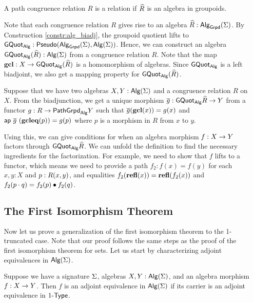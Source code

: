 \begin{definition}
A path congruence relation $R$ is a  relation if $\widehat{R}$ is an algebra in groupoids.
\end{definition}

Note that each congruence relation $R$ gives rise to an algebra $\widehat{R} : \mathsf{Alg}_{\mathsf{Grpd}}(\Sigma)$.
By Construction \ref{constr:alg_biadj}, the groupoid quotient lifts to $\mathsf{GQuot}_{\mathsf{Alg}} : \mathsf{Pseudo}(\mathsf{Alg}_{\mathsf{Grpd}}(\Sigma), \mathsf{Alg}(\Sigma))$.
Hence, we can construct an algebra $\mathsf{GQuot}_{\mathsf{Alg}}(\widehat{R}) : \mathsf{Alg}(\Sigma)$ from a congruence relation $R$.
Note that the map $\operatorname{\mathbf{gcl}} : X \rightarrow \mathsf{GQuot}_{\mathsf{Alg}}(\widehat{R})$ is a homomorphism of algebras.
Since $\mathsf{GQuot}_{\mathsf{Alg}}$ is a left biadjoint, we also get a mapping property for $\mathsf{GQuot}_{\mathsf{Alg}}(\widehat{R})$.

\begin{remark}
\label{remark:mapping_property_congruence}
Suppose that we have two algebras $X, Y : \mathsf{Alg}(\Sigma)$ and a congruence relation $R$ on $X$.
From the biadjunction, we get a unique morphism $\overline{g} : \mathsf{GQuot}_{\mathsf{Alg}}{\widehat{R}} \rightarrow Y$ from a functor $g : R \rightarrow \mathsf{PathGrpd}_{\mathsf{Alg}}{Y}$ such that $\overline{g}(\operatorname{\mathbf{gcl}}(x)) = g(x)$ and $\mathsf{ap} \ \overline{g} \ (\operatorname{\mathbf{gcleq}}(p)) = g(p)$ where $p$ is a morphism in $R$ from $x$ to $y$.

Using this, we can give conditions for when an algebra morphism $f : X \rightarrow Y$ factors through $\mathsf{GQuot}_{\mathsf{Alg}}{\widehat{R}}$.
We can unfold the definition to find the necessary ingredients for the factorization.
For example, we need to show that $f$ lifts to a functor, which means we need to provide a path $f_2 : f(x) = f(y)$ for each $x, y : X$ and $p : R(x, y)$, and equalities $f_2(\operatorname{\mathbf{refl}}(x)) =\operatorname{\mathbf{refl}}(f_2(x))$ and $f_2(p \cdot q) = f_2(p) \bullet f_2(q)$.
\end{remark}

\subsection{The First Isomorphism Theorem}
Now let us prove a generalization of the first isomorphism theorem to the 1-truncated case.
Note that our proof follows the same steps as the proof of the first isomorphism theorem for sets.
Let us start by characterizing adjoint equivalences in $\mathsf{Alg}(\Sigma)$.

\begin{proposition}
\label{prop:algebra_adjequiv}
Suppose we have a signature $\Sigma$, algebras $X, Y : \mathsf{Alg}(\Sigma)$, and an algebra morphism $f : X \rightarrow Y$.
Then $f$ is an adjoint equivalence in $\mathsf{Alg}(\Sigma)$ if its carrier is an adjoint equivalence in $1\mbox{-}\mathsf{Type}$.
\end{proposition}

